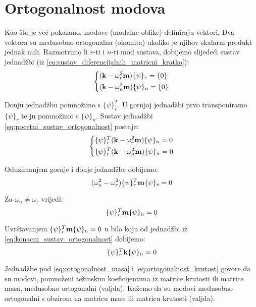 \section{Ortogonalnost modova}
Kao što je već pokazano, modove (modalne oblike) definiraju vektori. Dva vektora su
međusobno ortogonalna (okomita) ukoliko je njihov skalarni produkt jednak nuli.
Razmotrimo li $r$-ti i $n$-ti mod sustava, dobijemo slijedeći sustav jednadžbi 
(iz \eqref{eq:sustav_diferencijalnih_matricni_kratko}):
\begin{equation}\label{eq:pocetni_sustav_ortogonalnost}
    \begin{dcases}
        (\mathbf{k}-\omega_r^2\mathbf{m})\{\psi\}_r=\{0\}\\
        (\mathbf{k}-\omega_n^2\mathbf{m})\{\psi\}_n=\{0\}
    \end{dcases}
\end{equation}

Donju jednadžbu pomnožimo s $\{\psi\}_r^T$. U gornjoj jednadžbi prvo
transponiramo $\{\psi\}_r$ te ju pomnožimo s $\{\psi\}_n$. Sustav jednadžbi
\eqref{eq:pocetni_sustav_ortogonalnost} postaje:
\begin{equation}\label{eq:konacni_sustav_ortogonalnost}
    \begin{dcases}
        \{\psi\}_r^T(\mathbf{k}-\omega_r^2\mathbf{m})\{\psi\}_n=0\\
        \{\psi\}_r^T(\mathbf{k}-\omega_n^2\mathbf{m})\{\psi\}_n=0
    \end{dcases}
\end{equation}

Oduzimanjem gornje i donje jednadžbe dobijemo:
\begin{equation}
    (\omega_n^2-\omega_r^2)\{\psi\}_r^T\mathbf{m}\{\psi\}_s=0
\end{equation}

Za $\omega_n\neq\omega_r$ vrijedi:
\begin{equation}\label{eq:ortogonalnost_masa}
    \{\psi\}_r^T\mathbf{m}\{\psi\}_n=0
\end{equation}

Uvrštavanjem $\{\psi\}_r^T\mathbf{m}\{\psi\}_n=0$ u bilo koju od jednadžbi iz
\eqref{eq:konacni_sustav_ortogonalnost} dobijemo:
\begin{equation}\label{eq:ortogonalnost_krutost}
    \{\psi\}_r^T\mathbf{k}\{\psi\}_n=0
\end{equation}

Jednadžbe pod \eqref{eq:ortogonalnost_masa} i \eqref{eq:ortogonalnost_krutost}
govore da su modovi, pomnoženi težinskim koeficijentima iz matrice krutosti ili
matrice masa, međusobno ortogonalni (valjda). Kažemo da su modovi međusobno ortogonalni s
obzirom na matricu mase ili matricu krutosti (valjda).
\par

